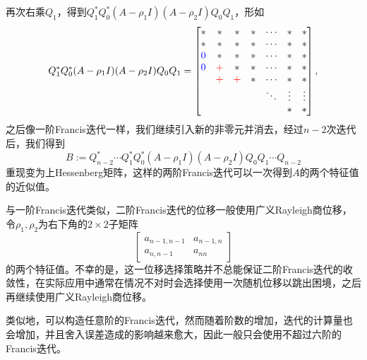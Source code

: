 \documentclass[a4paper,10pt]{ctexart}
\begin{document}
再次右乘$ Q_1 $，得到$ Q_1^*Q_0^*(A-\rho_1 I)(A-\rho_2 I)Q_0Q_1 $，形如
\[
    Q_1^*Q_0^*(A-\rho_1 I)(A-\rho_2 I)Q_0Q_1 = 
    \begin{bmatrix} 
        * & * & * & * & \cdots & * & * \\
        * & * & * & * & \cdots & * & * \\
        \textcolor{blue}{0} & * & * & * & \cdots & * & * \\
        \textcolor{blue}{0}  & \textcolor{red}{+}  & * & * & \cdots & * & * \\
            &  \textcolor{red}{+} &  \textcolor{red}{+} & * & \cdots & * & * \\
            &   & &  & \ddots & \vdots & \vdots \\
            &   &   &      &  & * & *
    \end{bmatrix},  
\]
之后像一阶Francis迭代一样，我们继续引入新的非零元并消去，经过$ n-2 $次迭代后，我们得到
\[
    B:= Q_{n-2}^*\cdots Q_1^*Q_0^*(A-\rho_1 I)(A-\rho_2 I)Q_0Q_1\cdots Q_{n-2}
\]
重现变为上Hessenberg矩阵，这样的两阶Francis迭代可以一次得到$ A $的两个特征值的近似值。

与一阶Francis迭代类似，二阶Francis迭代的位移一般使用广义Rayleigh商位移，令$ \rho_1,\rho_2 $为右下角的$ 2\times 2 $子矩阵
\[
    \begin{bmatrix} 
        a_{n-1,n-1} & a_{n-1,n} \\
        a_{n,n-1} & a_{nn}
    \end{bmatrix}
\]
的两个特征值。不幸的是，这一位移选择策略并不总能保证二阶Francis迭代的收敛性，在实际应用中通常在情况不对时会选择使用一次随机位移以跳出困境，之后再继续使用广义Rayleigh商位移。

类似地，可以构造任意阶的Francis迭代，然而随着阶数的增加，迭代的计算量也会增加，并且舍入误差造成的影响越来愈大，因此一般只会使用不超过六阶的Francis迭代。



\end{document}
